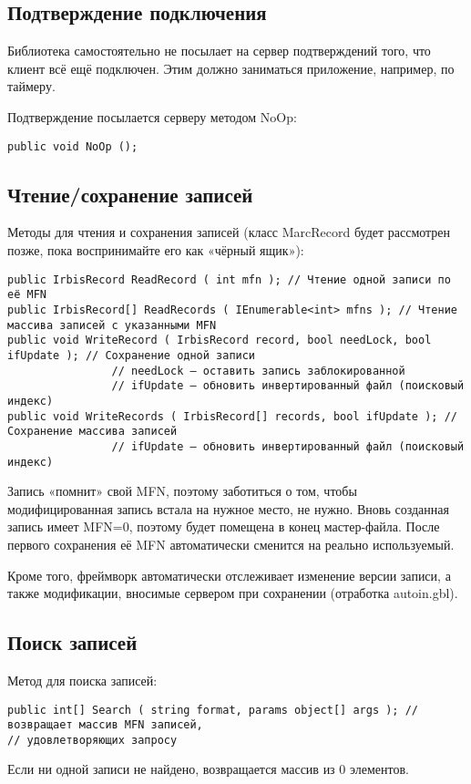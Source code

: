 \subsection{Подтверждение подключения}

Библиотека самостоятельно не посылает на сервер подтверждений того, что клиент всё ещё подключен. Этим должно заниматься приложение, например, по таймеру. 

Подтверждение посылается серверу методом NoOp:
\begin{lstlisting}
public void NoOp ();
\end{lstlisting}
\subsection{Чтение/сохранение записей}

Методы для чтения и сохранения записей (класс MarcRecord будет рассмотрен позже, пока воспринимайте его как «чёрный ящик»): 
\begin{lstlisting}
public IrbisRecord ReadRecord ( int mfn ); // Чтение одной записи по её MFN
public IrbisRecord[] ReadRecords ( IEnumerable<int> mfns ); // Чтение массива записей с указанными MFN
public void WriteRecord ( IrbisRecord record, bool needLock, bool ifUpdate ); // Сохранение одной записи
				// needLock – оставить запись заблокированной
				// ifUpdate – обновить инвертированный файл (поисковый индекс)
public void WriteRecords ( IrbisRecord[] records, bool ifUpdate ); // Сохранение массива записей
				// ifUpdate – обновить инвертированный файл (поисковый индекс)
\end{lstlisting}
Запись «помнит» свой MFN, поэтому заботиться о том, чтобы модифицированная запись встала на нужное место, не нужно. Вновь созданная запись имеет MFN=0, поэтому будет помещена в конец мастер-файла. После первого сохранения её MFN автоматически сменится на реально используемый.

Кроме того, фреймворк автоматически отслеживает изменение версии записи, а также модификации, вносимые сервером при сохранении (отработка autoin.gbl).

\subsection{Поиск записей}

Метод для поиска записей: 
\begin{lstlisting}
public int[] Search ( string format, params object[] args ); // возвращает массив MFN записей, 
// удовлетворяющих запросу
\end{lstlisting}
Если ни одной записи не найдено, возвращается массив из 0 элементов. 

